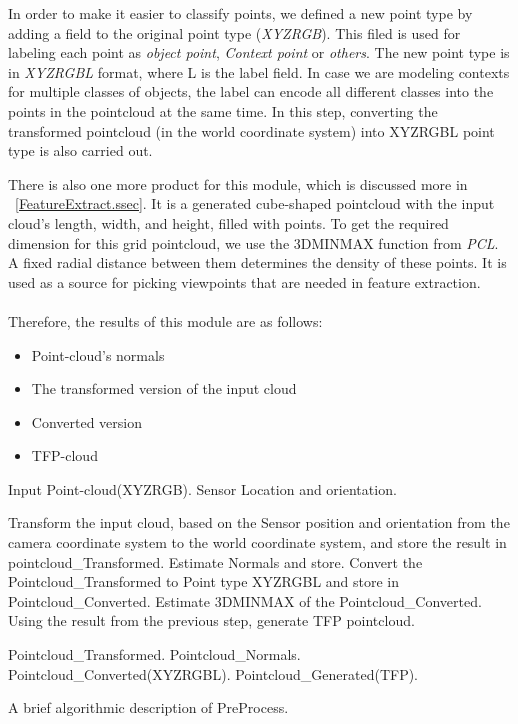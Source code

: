  
 In order to make it easier to classify points, we defined a new point type by adding a field to the original point type ({\it XYZRGB}). This filed is used for labeling each point as {\it object point}, {\it Context point} or {\it others}. The new point type is in {\it XYZRGBL} format, where L is the label field. In case we are modeling contexts for multiple classes of objects, the label can encode all different classes into the points in the pointcloud at the same time. In this step, converting the transformed pointcloud (in the world coordinate system) into XYZRGBL point type is also carried out.
 
 
 There is also one more product for this module, which is discussed more in ~\ref{FeatureExtract.ssec}.
 It is a generated cube-shaped pointcloud with the input cloud's length, width, and height, filled with points. To get the required dimension for this grid pointcloud, we use the 3DMINMAX function from {\it PCL}. A fixed radial distance between them determines the density of these points. It is used as a source for picking viewpoints that are needed in feature extraction.
 \\
 \\
 Therefore, the results of this module are as follows:
 \begin{itemize}
  \item Point-cloud's normals
  \item The transformed version of the input cloud
  \item Converted version
  \item TFP-cloud
 \end{itemize}
 
\begin{algorithm}[t]
\begin{algorithmic}[1]
\REQUIRE Input Point-cloud(XYZRGB).
\REQUIRE Sensor Location and orientation.
\medskip

\STATE Transform the input cloud, based on the Sensor position and orientation from the camera coordinate system to the world coordinate system, and store the result in pointcloud\_Transformed.
\STATE Estimate Normals and store.
\STATE Convert the Pointcloud\_Transformed to Point type XYZRGBL and store in Pointcloud\_Converted.
\STATE Estimate 3DMINMAX of the Pointcloud\_Converted.
\STATE Using the result from the previous step, generate TFP pointcloud.

\medskip
\ENSURE Pointcloud\_Transformed.
\ENSURE Pointcloud\_Normals.
\ENSURE Pointcloud\_Converted(XYZRGBL).
\ENSURE Pointcloud\_Generated(TFP).

\end{algorithmic}
\caption[PreProcess.]
{A brief algorithmic description of PreProcess.}
\label{Preprocess.algorithm}
\end{algorithm}



